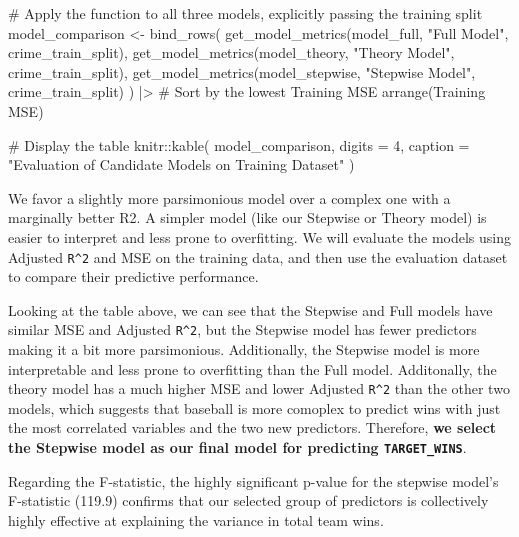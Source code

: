 \documentclass[
  11pt]{article}
\newenvironment{Shaded}{\begin{snugshade}}{\end{snugshade}}
\newcommand{\AttributeTok}[1]{\textcolor[rgb]{0.40,0.45,0.13}{#1}}
\newcommand{\CommentTok}[1]{\textcolor[rgb]{0.37,0.37,0.37}{#1}}
\newcommand{\DecValTok}[1]{\textcolor[rgb]{0.68,0.00,0.00}{#1}}
\newcommand{\FunctionTok}[1]{\textcolor[rgb]{0.28,0.35,0.67}{#1}}
\newcommand{\NormalTok}[1]{\textcolor[rgb]{0.00,0.23,0.31}{#1}}
\newcommand{\OtherTok}[1]{\textcolor[rgb]{0.00,0.23,0.31}{#1}}
\newcommand{\SpecialCharTok}[1]{\textcolor[rgb]{0.37,0.37,0.37}{#1}}
\newcommand{\StringTok}[1]{\textcolor[rgb]{0.13,0.47,0.30}{#1}}
\begin{document}
\begin{Shaded}
\begin{Highlighting}[]
\CommentTok{\# Apply the function to all three models, explicitly passing the training split}
\NormalTok{model\_comparison }\OtherTok{\textless{}{-}} \FunctionTok{bind\_rows}\NormalTok{(}
  \FunctionTok{get\_model\_metrics}\NormalTok{(model\_full, }\StringTok{"Full Model"}\NormalTok{, crime\_train\_split),}
  \FunctionTok{get\_model\_metrics}\NormalTok{(model\_theory, }\StringTok{"Theory Model"}\NormalTok{, crime\_train\_split),}
  \FunctionTok{get\_model\_metrics}\NormalTok{(model\_stepwise, }\StringTok{"Stepwise Model"}\NormalTok{, crime\_train\_split)}
\NormalTok{) }\SpecialCharTok{|\textgreater{}}
  \CommentTok{\# Sort by the lowest Training MSE }
  \FunctionTok{arrange}\NormalTok{(}\StringTok{\textasciigrave{}}\AttributeTok{Training MSE}\StringTok{\textasciigrave{}}\NormalTok{)}

\CommentTok{\# Display the table}
\NormalTok{knitr}\SpecialCharTok{::}\FunctionTok{kable}\NormalTok{(}
\NormalTok{  model\_comparison, }
  \AttributeTok{digits =} \DecValTok{4}\NormalTok{, }
  \AttributeTok{caption =} \StringTok{"Evaluation of Candidate Models on Training Dataset"}
\NormalTok{)}
\end{Highlighting}
\end{Shaded}

We favor a slightly more parsimonious model over a complex one with a
marginally better R2. A simpler model (like our Stepwise or Theory
model) is easier to interpret and less prone to overfitting. We will
evaluate the models using Adjusted \texttt{R\^{}2} and MSE on the
training data, and then use the evaluation dataset to compare their
predictive performance.

Looking at the table above, we can see that the Stepwise and Full models
have similar MSE and Adjusted \texttt{R\^{}2}, but the Stepwise model
has fewer predictors making it a bit more parsimonious. Additionally,
the Stepwise model is more interpretable and less prone to overfitting
than the Full model. Additonally, the theory model has a much higher MSE
and lower Adjusted \texttt{R\^{}2} than the other two models, which
suggests that baseball is more comoplex to predict wins with just the
most correlated variables and the two new predictors. Therefore,
\textbf{we select the Stepwise model as our final model for predicting
\texttt{TARGET\_WINS}}.

Regarding the F-statistic, the highly significant p-value for the
stepwise model's F-statistic (119.9) confirms that our selected group of
predictors is collectively highly effective at explaining the variance
in total team wins.
\end{document}
